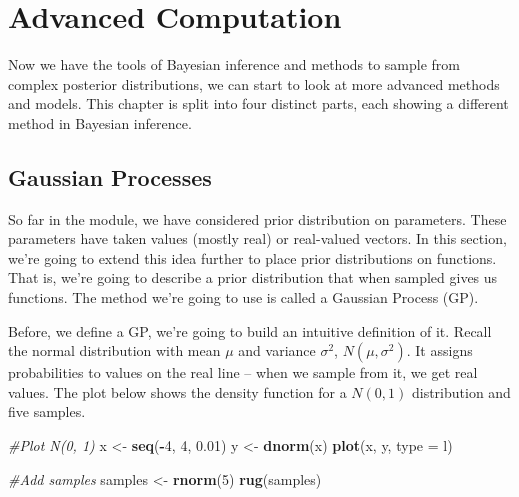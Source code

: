 \documentclass[
]{book}
\newenvironment{Shaded}{\begin{snugshade}}{\end{snugshade}}
\newcommand{\AttributeTok}[1]{\textcolor[rgb]{0.13,0.29,0.53}{#1}}
\newcommand{\CommentTok}[1]{\textcolor[rgb]{0.56,0.35,0.01}{\textit{#1}}}
\newcommand{\DecValTok}[1]{\textcolor[rgb]{0.00,0.00,0.81}{#1}}
\newcommand{\FloatTok}[1]{\textcolor[rgb]{0.00,0.00,0.81}{#1}}
\newcommand{\FunctionTok}[1]{\textcolor[rgb]{0.13,0.29,0.53}{\textbf{#1}}}
\newcommand{\NormalTok}[1]{#1}
\newcommand{\OtherTok}[1]{\textcolor[rgb]{0.56,0.35,0.01}{#1}}
\newcommand{\SpecialCharTok}[1]{\textcolor[rgb]{0.81,0.36,0.00}{\textbf{#1}}}
\newcommand{\StringTok}[1]{\textcolor[rgb]{0.31,0.60,0.02}{#1}}
\theoremstyle{definition}
\theoremstyle{definition}
\theoremstyle{definition}
\theoremstyle{definition}
\theoremstyle{remark}
\begin{document}
\hypertarget{advanced-computation}{%
\chapter{Advanced Computation}\label{advanced-computation}}

Now we have the tools of Bayesian inference and methods to sample from complex posterior distributions, we can start to look at more advanced methods and models. This chapter is split into four distinct parts, each showing a different method in Bayesian inference.

\hypertarget{gaussian-processes}{%
\section{Gaussian Processes}\label{gaussian-processes}}

So far in the module, we have considered prior distribution on parameters. These parameters have taken values (mostly real) or real-valued vectors. In this section, we're going to extend this idea further to place prior distributions on functions. That is, we're going to describe a prior distribution that when sampled gives us functions. The method we're going to use is called a Gaussian Process (GP).

Before, we define a GP, we're going to build an intuitive definition of it. Recall the normal distribution with mean \(\mu\) and variance \(\sigma^2\), \(N(\mu, \sigma^2)\). It assigns probabilities to values on the real line -- when we sample from it, we get real values. The plot below shows the density function for a \(N(0, 1)\) distribution and five samples.

\begin{Shaded}
\begin{Highlighting}[]
\CommentTok{\#Plot N(0, 1)}
\NormalTok{x }\OtherTok{\textless{}{-}} \FunctionTok{seq}\NormalTok{(}\SpecialCharTok{{-}}\DecValTok{4}\NormalTok{, }\DecValTok{4}\NormalTok{, }\FloatTok{0.01}\NormalTok{)}
\NormalTok{y }\OtherTok{\textless{}{-}} \FunctionTok{dnorm}\NormalTok{(x)}
\FunctionTok{plot}\NormalTok{(x, y, }\AttributeTok{type =} \StringTok{\textquotesingle{}l\textquotesingle{}}\NormalTok{)}

\CommentTok{\#Add samples}
\NormalTok{samples }\OtherTok{\textless{}{-}} \FunctionTok{rnorm}\NormalTok{(}\DecValTok{5}\NormalTok{)}
\FunctionTok{rug}\NormalTok{(samples)}
\end{Highlighting}
\end{Shaded}
\end{document}
